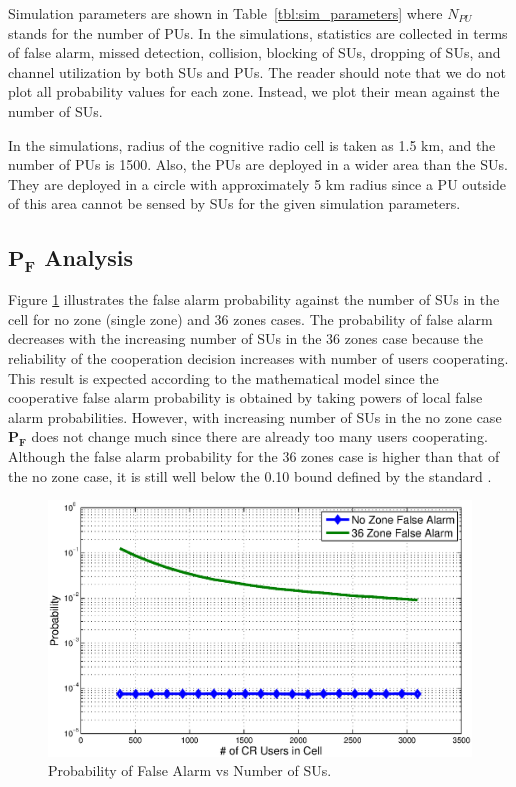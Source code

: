 \documentclass[conference,compsoc]{IEEEtran}
\newcommand{\probf}{\mathbf{P_F}}
\newcommand{\CR}{cognitive radio }
\begin{document}
Simulation parameters are shown in Table~\ref{tbl:sim_parameters} where $N_{PU}$ stands for the number of PUs. In the simulations, statistics are collected in terms of false alarm, missed detection, collision, blocking of SUs, dropping of SUs, and channel utilization by both SUs and PUs. The reader should note that we do not plot all probability values for each zone. Instead, we plot their mean against the number of SUs.

In the simulations, radius of the \CR cell is taken as 1.5 km, and the number of PUs is 1500. Also, the PUs are deployed in a wider area than the SUs. They are deployed in a circle with approximately 5 km radius since a PU outside of this area cannot be sensed by SUs for the given simulation parameters.

\subsection{$\probf$ Analysis}
Figure \ref{fig:probf} illustrates the false alarm probability against the number of SUs in the cell for no zone (single zone) and 36 zones cases. The probability of false alarm decreases with the increasing number of SUs in the 36 zones case because the reliability of the cooperation decision increases with number of users cooperating. This result is expected according to the mathematical model since the cooperative false alarm probability is obtained by taking powers of local false alarm probabilities. However, with increasing number of SUs in the no zone case  $\probf$ does not change much since there are already too many users cooperating. Although the false alarm probability for the 36 zones case is higher than that of the no zone case, it is still well below the 0.10 bound defined by the standard \cite{wranstandard}.

\begin{figure}[t]
\centering
\includegraphics[width=0.99\columnwidth,keepaspectratio] {figs/pf.eps}
\caption{Probability of False Alarm vs Number of SUs.}
\label{fig:probf}
\end{figure}
\end{document}

